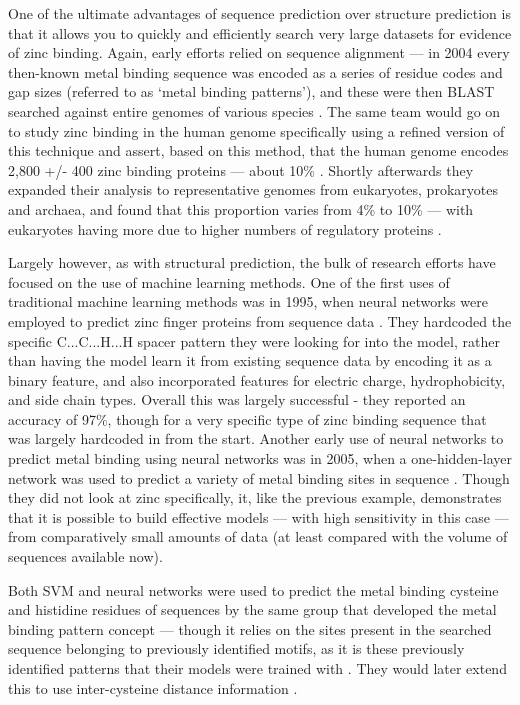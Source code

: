 One of the ultimate advantages of sequence prediction over structure prediction is that it allows you to quickly and efficiently search very large datasets for evidence of zinc binding. Again, early efforts relied on sequence alignment --- in 2004 every then-known metal binding sequence was encoded as a series of residue codes and gap sizes (referred to as `metal binding patterns'), and these were then BLAST searched against entire genomes of various species \cite{andreini2004hint}. The same team would go on to study zinc binding in the human genome specifically using a refined version of this technique and assert, based on this method, that the human genome encodes 2,800 +/- 400 zinc binding proteins --- about 10\% \cite{andreini2006counting}. Shortly afterwards they expanded their analysis to representative genomes from eukaryotes, prokaryotes and archaea, and found that this proportion varies from 4\% to 10\% --- with eukaryotes having more due to higher numbers of regulatory proteins \cite{passerini2007predicting}.

Largely however, as with structural prediction, the bulk of research efforts have focused on the use of machine learning methods. One of the first uses of traditional machine learning methods was in 1995, when neural networks were employed to predict zinc finger proteins from sequence data \cite{nakata1995prediction}. They hardcoded the specific C...C...H...H spacer pattern they were looking for into the model, rather than having the model learn it from existing sequence data by encoding it as a binary feature, and also incorporated features for electric charge, hydrophobicity, and side chain types. Overall this was largely successful - they reported an accuracy of 97\%, though for a very specific type of zinc binding sequence that was largely hardcoded in from the start. Another early use of neural networks to predict metal binding using neural networks was in 2005, when a one-hidden-layer network was used to predict a variety of metal binding sites in sequence \cite{lin2005protein}. Though they did not look at zinc specifically, it, like the previous example, demonstrates that it is possible to build effective models --- with high sensitivity in this case --- from comparatively small amounts of data (at least compared with the volume of sequences available now).

Both SVM and neural networks were used to predict the metal binding cysteine and histidine residues of sequences by the same group that developed the metal binding pattern concept --- though it relies on the sites present in the searched sequence belonging to previously identified motifs, as it is these previously identified patterns that their models were trained with \cite{passerini2006identifying}. They would later extend this to use inter-cysteine distance information \cite{passerini2007predicting}. 

